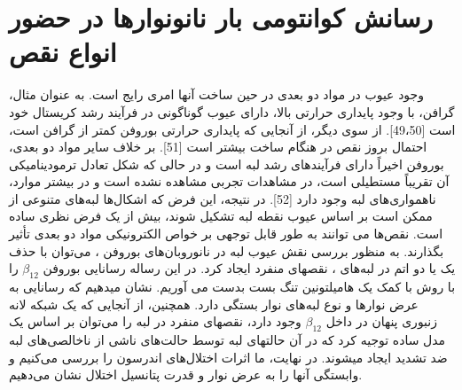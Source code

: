 \section{رسانش کوانتومی بار نانونوارها در حضور انواع نقص}
وجود عیوب در مواد دو بعدی در حین ساخت آنها امری رایج است. به عنوان مثال، گرافن، با وجود پایداری حرارتی بالا، دارای عیوب گوناگونی در فرآیند رشد کریستال خود است [49،50]. از سوی دیگر، از آنجایی که پایداری حرارتی بوروفن کمتر از گرافن است، احتمال بروز نقص در هنگام ساخت بیشتر است [51]. بر خلاف سایر مواد دو بعدی، بوروفن اخیراً دارای فرآیندهای رشد لبه است و در حالی که شکل تعادل ترمودینامیکی آن تقریباً مستطیلی است، در مشاهدات تجربی مشاهده نشده است و در بیشتر موارد، ناهمواری‌های لبه وجود دارد [52]. در نتیجه، این فرض که اشکال‌ها لبه‌های متنوعی از ممکن است بر اساس عیوب نقطه لبه تشکیل شوند، بیش از یک فرض نظری ساده است. نقص‌ها می توانند به طور قابل توجهی بر خواص الکترونیکی مواد دو بعدی تأثیر بگذارند. به منظور بررسی نقش عیوب لبه در نانوروبان‌های بوروفن ، می‌توان با حذف یک یا دو اتم در لبه‌های ، نقصهای منفرد ایجاد کرد. در این رساله رسانایی بوروفن $\beta_{12}$ را با روش  با کمک یک هامیلتونین \gls{تنگ بست} بدست می آوریم. نشان میدهیم که رسانایی به عرض نوارها و نوع لبه‌های نوار بستگی دارد. همچنین، از آنجایی که یک شبکه لانه زنبوری پنهان در داخل $\beta_{12}$ وجود دارد، نقصهای منفرد در لبه را می‌توان بر اساس یک مدل ساده توجیه کرد که در آن حالتهای لبه توسط حالت‌های ناشی از ناخالصی‌های لبه ضد تشدید ایجاد میشوند. در نهایت، ما اثرات اختلال‌های اندرسون را بررسی می‌کنیم و وابستگی آنها را به عرض نوار و قدرت پتانسیل اختلال نشان می‌دهیم.
